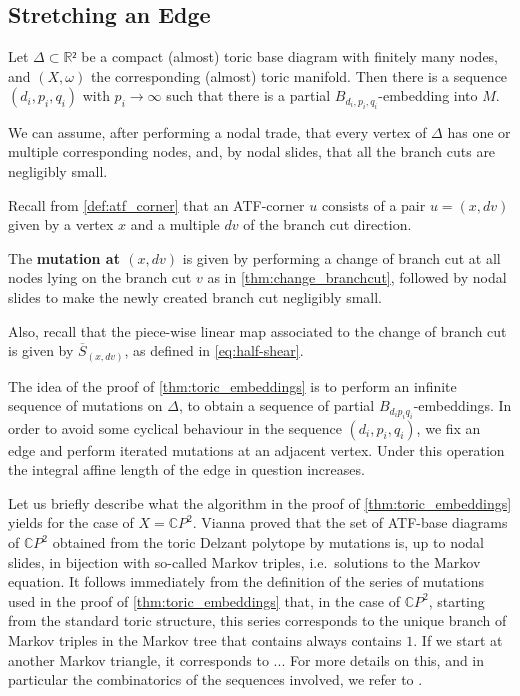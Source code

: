 \documentclass[12pt,a4paper,abstract=true,draft]{scrartcl}
\begin{document}
\subsection{Stretching an Edge}
\label{sec:stretch_edge}

\begin{proposition}
  \label{thm:toric_embeddings}
  Let $Δ ⊂ ℝ²$ be a compact (almost) toric base diagram with finitely many nodes, and $(X,ω)$ the corresponding (almost) toric manifold.
  Then there is a sequence $(d_i,p_i,q_i)$ with $p_i → ∞$ such that there is a partial $B_{d_i,p_i,q_i}$-embedding into $M$.
\end{proposition}

We can assume, after performing a nodal trade, that every vertex of $Δ$ has one or multiple corresponding nodes, and, by nodal slides, that all the branch cuts are negligibly small.

Recall from \cref{def:atf_corner} that an ATF-corner $u$ consists of a pair $u=(x,dv)$ given by a vertex $x$ and a multiple $dv$ of the branch cut direction.

\begin{definition}
  \label{def:mutation_at_atf_corner}
  The \textbf{mutation at $(x,dv)$} is given by performing a change of branch cut at all nodes lying on the branch cut $v$ as in \cref{thm:change_branchcut}, followed by nodal slides to make the newly created branch cut negligibly small.
\end{definition}

Also, recall that the piece-wise linear map associated to the change of branch cut is given by $\overline{S}_{(x,dv)}$, as defined in \eqref{eq:half-shear}.

The idea of the proof of \cref{thm:toric_embeddings} is to perform an infinite sequence of mutations on $Δ$, to obtain a sequence of partial $B_{d_i p_i q_i}$-embeddings.
In order to avoid some cyclical behaviour in the sequence $(d_i,p_i,q_i)$, we fix an edge and perform iterated mutations at an adjacent vertex.
Under this operation the integral affine length of the edge in question increases.

\begin{remark}
    Let us briefly describe what the algorithm in the proof of \cref{thm:toric_embeddings} yields for the case of $X = \mathbb{C}P^2$. Vianna \cite{Via16} proved that the set of ATF-base diagrams of $\mathbb{C}P^2$ obtained from the toric Delzant polytope by mutations is, up to nodal slides, in bijection with so-called Markov triples, i.e.\ solutions to the Markov equation. It follows immediately from the definition of the series of mutations used in the proof of \cref{thm:toric_embeddings} that, in the case of $\mathbb{C}P^2$, starting from the standard toric structure, this series corresponds to the unique branch of Markov triples in the Markov tree that contains always contains $1$. If we start at another Markov triangle, it corresponds to ...
For more details on this, and in particular the combinatorics of the sequences involved, we refer to \cite[Section 8.4, Appendix I]{evans2021atfs}.
\end{remark}
\end{document}
